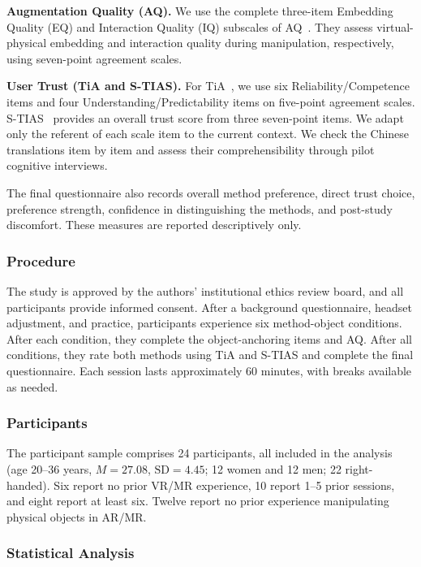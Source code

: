 \documentclass[review]{vgtc}
\begin{document}
\textbf{Augmentation Quality (AQ).}
We use the complete three-item Embedding Quality (EQ) and Interaction Quality (IQ) subscales of AQ~\cite{aq2026}. They assess virtual-physical embedding and interaction quality during manipulation, respectively, using seven-point agreement scales.

\textbf{User Trust (TiA and S-TIAS).}
For TiA~\cite{tia2019}, we use six Reliability/Competence items and four Understanding/Predictability items on five-point agreement scales. S-TIAS~\cite{stias2025} provides an overall trust score from three seven-point items. We adapt only the referent of each scale item to the current context. We check the Chinese translations item by item and assess their comprehensibility through pilot cognitive interviews.

The final questionnaire also records overall method preference, direct trust choice, preference strength, confidence in distinguishing the methods, and post-study discomfort. These measures are reported descriptively only.

\subsubsection{Procedure}

The study is approved by the authors' institutional ethics review board, and all participants provide informed consent. After a background questionnaire, headset adjustment, and practice, participants experience six method-object conditions. After each condition, they complete the object-anchoring items and AQ. After all conditions, they rate both methods using TiA and S-TIAS and complete the final questionnaire. Each session lasts approximately 60 minutes, with breaks available as needed.

\subsubsection{Participants}

The participant sample comprises 24 participants, all included in the analysis (age 20--36 years, $M=27.08$, $\mathrm{SD}=4.45$; 12 women and 12 men; 22 right-handed). Six report no prior VR/MR experience, 10 report 1--5 prior sessions, and eight report at least six. Twelve report no prior experience manipulating physical objects in AR/MR.

\subsubsection{Statistical Analysis}
\end{document}
